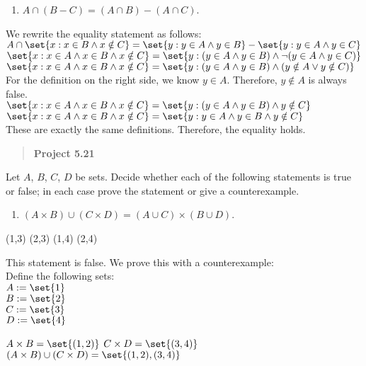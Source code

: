 \begin{enumerate}
\def\labelenumi{(\roman{enumi})}
\setcounter{enumi}{1}
\tightlist
\item
  \(A \cap (B - C) = (A \cap B) - (A \cap C)\).
\end{enumerate}

We rewrite the equality statement as follows:\\
\(A \cap \set{x : x\in B \land x\notin C} = \set{y : y \in A \land y \in B} - \set{y : y \in A \land y\in C}\)\\
\(\set{x : x\in A \land x\in B \land x\notin C} = \set{y : (y \in A \land y \in B) \land \lnot (y \in A \land y\in C)}\)\\
\(\set{x : x\in A \land x\in B \land x\notin C} = \set{y : (y \in A \land y \in B) \land (y \notin A \lor y\notin C)}\)\\
For the definition on the right side, we know \(y\in A\). Therefore,
\(y\notin A\) is always false.\\
\(\set{x : x\in A \land x\in B \land x\notin C} = \set{y : (y \in A \land y \in B) \land y\notin C}\)\\
\(\set{x : x\in A \land x\in B \land x\notin C} = \set{y : y \in A \land y \in B \land y\notin C}\)\\
These are exactly the same definitions. Therefore, the equality holds.

\begin{quote}
\textbf{Project 5.21}
\end{quote}

Let \(A\), \(B\), \(C\), \(D\) be sets. Decide whether each of the
following statements is true or false; in each case prove the statement
or give a counterexample.

\begin{enumerate}
\def\labelenumi{(\roman{enumi})}
\tightlist
\item
  \((A \times B) \cup (C \times D) = (A \cup C) \times (B \cup D)\).
\end{enumerate}

(1,3) (2,3) (1,4) (2,4)

This statement is false. We prove this with a counterexample:\\
Define the following sets:\\
\(A:=\set{1}\)\\
\(B:=\set{2}\)\\
\(C:=\set{3}\)\\
\(D:=\set{4}\)

\(A \times B = \set{(1,2)}\) \(C \times D = \set{(3,4)}\)
\((A \times B) \cup (C \times D) = \set{(1,2), (3,4)}\)

